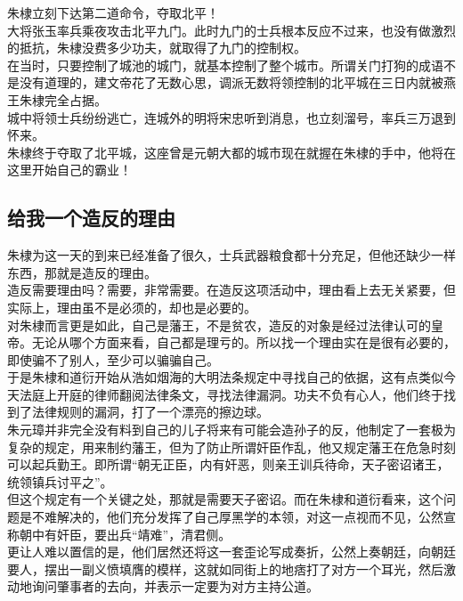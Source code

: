 \begin{multicols}{\theparacolNo}
朱棣立刻下达第二道命令，夺取北平！\\

大将张玉率兵乘夜攻击北平九门。此时九门的士兵根本反应不过来，也没有做激烈的抵抗，朱棣没费多少功夫，就取得了九门的控制权。\\

在当时，只要控制了城池的城门，就基本控制了整个城市。所谓关门打狗的成语不是没有道理的，建文帝花了无数心思，调派无数将领控制的北平城在三日内就被燕王朱棣完全占据。\\

城中将领士兵纷纷逃亡，连城外的明将宋忠听到消息，也立刻溜号，率兵三万退到怀来。\\

朱棣终于夺取了北平城，这座曾是元朝大都的城市现在就握在朱棣的手中，他将在这里开始自己的霸业！\\

\subsection{给我一个造反的理由}
朱棣为这一天的到来已经准备了很久，士兵武器粮食都十分充足，但他还缺少一样东西，那就是造反的理由。\\

造反需要理由吗？需要，非常需要。在造反这项活动中，理由看上去无关紧要，但实际上，理由虽不是必须的，却也是必要的。\\

对朱棣而言更是如此，自己是藩王，不是贫农，造反的对象是经过法律认可的皇帝。无论从哪个方面来看，自己都是理亏的。所以找一个理由实在是很有必要的，即使骗不了别人，至少可以骗骗自己。\\

于是朱棣和道衍开始从浩如烟海的大明法条规定中寻找自己的依据，这有点类似今天法庭上开庭的律师翻阅法律条文，寻找法律漏洞。功夫不负有心人，他们终于找到了法律规则的漏洞，打了一个漂亮的擦边球。\\

朱元璋并非完全没有料到自己的儿子将来有可能会造孙子的反，他制定了一套极为复杂的规定，用来制约藩王，但为了防止所谓奸臣作乱，他又规定藩王在危急时刻可以起兵勤王。即所谓“朝无正臣，内有奸恶，则亲王训兵待命，天子密诏诸王，统领镇兵讨平之”。\\

但这个规定有一个关键之处，那就是需要天子密诏。而在朱棣和道衍看来，这个问题是不难解决的，他们充分发挥了自己厚黑学的本领，对这一点视而不见，公然宣称朝中有奸臣，要出兵“靖难”，清君侧。\\

更让人难以置信的是，他们居然还将这一套歪论写成奏折，公然上奏朝廷，向朝廷要人，摆出一副义愤填膺的模样，这就如同街上的地痞打了对方一个耳光，然后激动地询问肇事者的去向，并表示一定要为对方主持公道。\\


\end{multicols}
